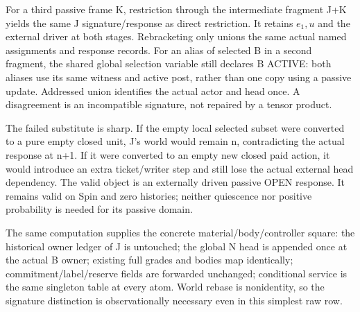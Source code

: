 \documentclass{article}\usepackage{amsmath,amssymb}
\begin{document}
For a third passive frame K, restriction through the intermediate fragment J+K yields the same J signature/response as direct restriction. It retains $e_1,u$ and the external driver at both stages. Rebracketing only unions the same actual named assignments and response records. For an alias of selected B in a second fragment, the shared global selection variable still declares B ACTIVE: both aliases use its same witness and active post, rather than one copy using a passive update. Addressed union identifies the actual actor and head once. A disagreement is an incompatible signature, not repaired by a tensor product.

The failed substitute is sharp. If the empty local selected subset were converted to a pure empty closed unit, J's world would remain n, contradicting the actual response at n+1. If it were converted to an empty new closed paid action, it would introduce an extra ticket/writer step and still lose the actual external head dependency. The valid object is an externally driven passive OPEN response. It remains valid on Spin and zero histories; neither quiescence nor positive probability is needed for its passive domain.

The same computation supplies the concrete material/body/controller square: the historical owner ledger of J is untouched; the global N head is appended once at the actual B owner; existing full grades and bodies map identically; commitment/label/reserve fields are forwarded unchanged; conditional service is the same singleton table at every atom. World rebase is nonidentity, so the signature distinction is observationally necessary even in this simplest raw row.
\end{document}
